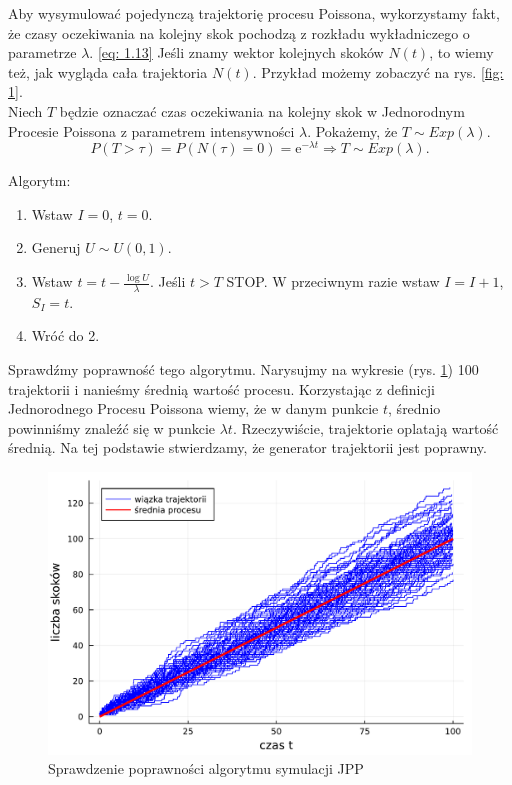 \documentclass{article}
\theoremstyle{break}
\newcommand*{\e}{\mathrm{e}}
\numberwithin{equation}{subsection}
\numberwithin{figure}{section}
\begin{document}
Aby wysymulować pojedynczą trajektorię procesu Poissona, wykorzystamy fakt, że czasy oczekiwania na kolejny skok pochodzą z rozkładu wykładniczego o parametrze $\lambda$. \eqref{eq: 1.13}
Jeśli znamy wektor kolejnych skoków $N(t)$, to wiemy też, jak wygląda cała trajektoria $N(t)$. Przykład możemy zobaczyć na rys. \ref{fig: 1}.\\

Niech $T$ będzie oznaczać czas oczekiwania na kolejny skok w Jednorodnym Procesie Poissona z parametrem intensywności $\lambda$. Pokażemy, że $T \sim Exp(\lambda)$.
\begin{equation}
P(T>\tau) = P(N(\tau)=0) = \e^{-\lambda t} \Rightarrow T \sim Exp(\lambda) \label{eq: 1.13}.
\end{equation}

Algorytm:

\begin{enumerate}
\item Wstaw $I=0$, $t =0$.
\item Generuj $U\sim U(0,1)$.
\item Wstaw $t = t - \frac{\log{U}}{\lambda}$. Jeśli $t>T$ STOP. W przeciwnym razie wstaw $I = I+1$, $S_I=t$.
\item Wróć do 2.
\end{enumerate} 

Sprawdźmy poprawność tego algorytmu. Narysujmy na wykresie (rys. \ref{fig: 2}) 100 trajektorii i nanieśmy średnią wartość procesu. Korzystając z definicji Jednorodnego Procesu Poissona wiemy, że w danym punkcie $t$, średnio powinniśmy znaleźć się w punkcie $\lambda t$.
Rzeczywiście, trajektorie oplatają wartość średnią. Na tej podstawie stwierdzamy, że generator trajektorii jest poprawny.

\begin{figure}[H]
	\center
	\includegraphics[scale=0.35]{poprawność_poissona.pdf}
	\caption{Sprawdzenie poprawności algorytmu symulacji JPP}
	\label{fig: 2}
\end{figure}
\end{document}
